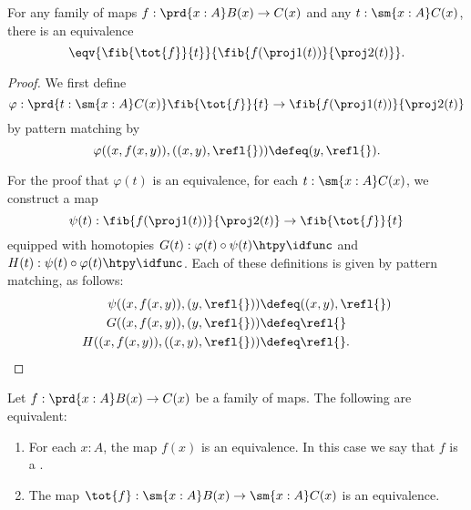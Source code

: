 \begin{lem}\label{lem:fib_total}
  For any family of maps $f:\prd{x:A}B(x)\to C(x)$ and any $t:\sm{x:A}C(x)$,
  there is an equivalence
  \begin{equation*}
    \eqv{\fib{\tot{f}}{t}}{\fib{f(\proj 1(t))}{\proj 2(t)}}.
  \end{equation*}
\end{lem}

\begin{proof}
  We first define
  \begin{equation*}
    \varphi : \prd{t:\sm{x:A}C(x)} \fib{\tot{f}}{t}\to\fib{f(\proj 1(t))}{\proj 2(t)}
  \end{equation*}
  by pattern matching by
  \begin{equation*}
    \varphi((x,f(x,y)),((x,y),\refl{}))\defeq(y,\refl{}).
  \end{equation*}

  For the proof that $\varphi(t)$ is an equivalence, for each $t:\sm{x:A}C(x)$, we construct a map
  \begin{equation*}
    \psi(t) : \fib{f(\proj 1(t))}{\proj 2(t)}\to\fib{\tot{f}}{t}
  \end{equation*}
  equipped with homotopies $G(t):\varphi(t)\circ\psi(t)\htpy\idfunc$ and $H(t):\psi(t)\circ\varphi(t)\htpy\idfunc$. Each of these definitions is given by pattern matching, as follows:
  \begin{align*}
    \psi((x,f(x,y)),(y,\refl{})) & \defeq ((x,y),\refl{}) \\
    G((x,f(x,y)),(y,\refl{})) & \defeq \refl{} \\
    H((x,f(x,y)),((x,y),\refl{})) & \defeq \refl{}.\qedhere
  \end{align*}
\end{proof}

\begin{thm}\label{thm:fib_equiv}
  Let $f:\prd{x:A}B(x)\to C(x)$ be a family of maps. The following are equivalent:
\begin{enumerate}
\item For each $x:A$, the map $f(x)$ is an equivalence. In this case we say that $f$ is a .
\item The map $\tot{f}:\sm{x:A}B(x)\to\sm{x:A}C(x)$ is an equivalence.
\end{enumerate}
\end{thm}

